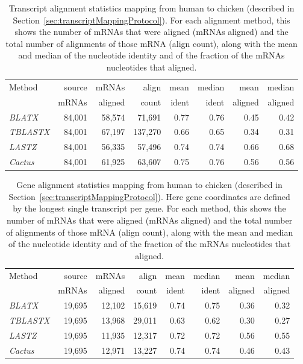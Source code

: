 \documentclass{article}
\newcommand{\secref}[1]{Section~\ref{#1}}
\begin{document}
\begin{table}[!htb]
\begin{center}
\begin{tabular}{l|r|r|r|r|r|r|r}
Method           & source & mRNAs   & align   & mean  & median & mean    & median  \\
                 & mRNAs  & aligned & count   & ident & ident  & aligned & aligned \\
\midrule                           
\textit{BLATX}   &  84,001 & 58,574  & 71,691  & 0.77  & 0.76   & 0.45    & 0.42    \\
\textit{TBLASTX} &  84,001 & 67,197  & 137,270 & 0.66  & 0.65   & 0.34    & 0.31    \\
\textit{LASTZ}   &  84,001 & 56,335  & 57,496  & 0.74  & 0.74   & 0.66    & 0.68    \\
\textit{Cactus}  &  84,001 & 61,925  & 63,607  & 0.75  & 0.76   & 0.56    & 0.56    \\
\end{tabular}
\caption{Transcript alignment statistics mapping from human to chicken (described in \secref{sec:transcriptMappingProtocol}).  For each alignment method, this shows the
  number of mRNAs that were aligned (mRNAs aligned) and the total number of
  alignments of those mRNA (align count), along with the mean and median of
  the nucleotide identity and of the fraction of the mRNAs nucleotides that
  aligned.  }\label{tab:humanChickenTranscriptAlignStats}
\end{center}
\end{table}

\begin{table}[!htb]
\begin{center}
\begin{tabular}{l|r|r|r|r|r|r|r}
Method           & source & mRNAs   & align   & mean  & median & mean    & median  \\
                 & mRNAs  & aligned & count   & ident & ident  & aligned & aligned \\
\midrule                           
\textit{BLATX}   &  19,695 & 12,102 & 15,619  & 0.74  & 0.75  & 0.36  & 0.32 \\
\textit{TBLASTX} &  19,695 & 13,968 & 29,011  & 0.63  & 0.62  & 0.30  & 0.27 \\
\textit{LASTZ}   &  19,695 & 11,935 & 12,317  & 0.72  & 0.72  & 0.56  & 0.55 \\
\textit{Cactus}  &  19,695 & 12,971 & 13,227  & 0.74  & 0.74  & 0.46  & 0.43 \\
\end{tabular}
\caption{Gene alignment statistics mapping from human to chicken (described in \secref{sec:transcriptMappingProtocol}).  Here gene coordinates are defined by the longest single transcript per gene.  For each method, this shows the
  number of mRNAs that were aligned (mRNAs aligned) and the total number of
  alignments of those mRNA (align count), along with the mean and median of
  the nucleotide identity and of the fraction of the mRNAs nucleotides that
  aligned.  }\label{tab:humanChickenGeneAlignStats}
\end{center}
\end{table}
\end{document}
